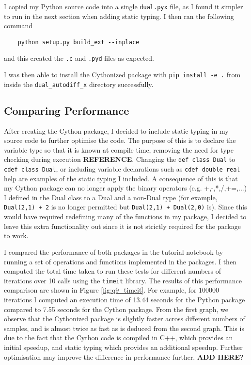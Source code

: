 \documentclass{article}
\begin{document}
I copied my Python source code into a single \texttt{dual.pyx} file, as I found it simpler to run in the next section when adding static typing. I then ran the following command
\begin{lstlisting}
    python setup.py build_ext --inplace
\end{lstlisting}
and this created the \texttt{.c} and \texttt{.pyd} files as expected. 

I was then able to install the Cythonized package with \texttt{pip install -e .} from inside the \texttt{dual\_autodiff\_x} directory successfully.

\subsection{ Comparing Performance }

After creating the Cython package, I decided to include static typing in my source code to further optimise the code. The purpose of this is to declare the variable type so that it is known at compile time, removing the need for type checking during execution \textbf{REFERENCE}. Changing the \texttt{def class Dual} to \texttt{cdef class Dual}, or including variable declarations such as \texttt{cdef double real} help are examples of the static typing I included. A consequence of this is that my Cython package can no longer apply the binary operators (e.g. +,-,*,/,+=,...) I defined in the Dual class to a Dual and a non-Dual type (for example, \texttt{Dual(2,1) + 2} is no longer permitted but \texttt{Dual(2,1) + Dual(2,0)} is). Since this would have required redefining many of the functions in my package, I decided to leave this extra functionality out since it is not strictly required for the package to work. 

I compared the performance of both packages in the tutorial notebook by running a set of operations and functions implemented in the packages. I then computed the total time taken to run these tests for different numbers of iterations over 10 calls using the \texttt{timeit} library. The results of this performance comparison are shown in Figure \ref{fig:q9_timeit}. For example, for 100000 iterations I computed an execution time of 13.44 seconds for the Python package compared to 7.55 seconds for the Cython package. From the first graph, we observe that the Cythonized package is slightly faster across different numbers of samples, and is almost twice as fast as is deduced from the second graph. This is due to the fact that the Cython code is compiled in C++, which provides an initial speedup, and static typing which provides an additional speedup. Further optimisation may improve the difference in performance further. \textbf{ADD HERE?}
\end{document}
